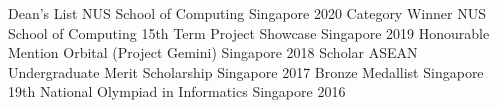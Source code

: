 



\begin{cvhonors}
  \cvhonor
  {Dean's List} %
  {NUS School of Computing} %
  {Singapore} %
  {2020} %
  \cvhonor
  {Category Winner} %
  {NUS School of Computing 15th Term Project Showcase} %
  {Singapore} %
  {2019} %
  \cvhonor
  {Honourable Mention} %
  {Orbital (Project Gemini)} %
  {Singapore} %
  {2018} %
  \cvhonor
  {Scholar} %
  {ASEAN Undergraduate Merit Scholarship} %
  {Singapore} %
  {2017} %
  \cvhonor
  {Bronze Medallist} %
  {Singapore 19th National Olympiad in Informatics} %
  {Singapore} %
  {2016} %




\end{cvhonors}
